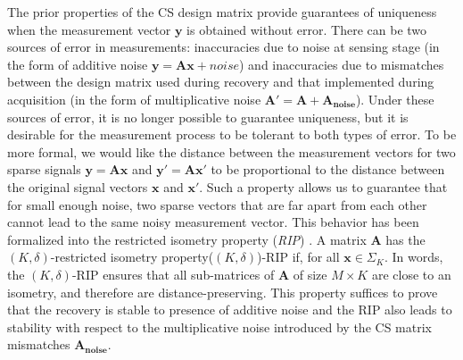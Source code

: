 \documentclass[journal]{IEEEtran}
\begin{document}
The prior properties of the CS design matrix provide guarantees of uniqueness when the measurement vector $\boldsymbol{y}$ is obtained without error. There can be two sources of error in measurements: inaccuracies due to noise at sensing stage (in the form of additive noise $\boldsymbol{y}=\boldsymbol{A}\boldsymbol{x}+noise$) and inaccuracies due to mismatches between the design matrix used during recovery and that implemented during acquisition (in the form of multiplicative noise $\boldsymbol{A'}=\boldsymbol{A}+\boldsymbol{A_{noise}}$). Under these sources of error, it is no longer possible to guarantee uniqueness, but it is desirable for the measurement process to be tolerant to both types of error. To be more formal, we would like the distance between the measurement vectors for two sparse signals $\boldsymbol{y}=\boldsymbol{A}\boldsymbol{x}$ and $\boldsymbol{y'}=\boldsymbol{A}\boldsymbol{x'}$ to be proportional to the distance between the original signal vectors $\boldsymbol{x}$ and $\boldsymbol{x'}$. Such a property allows us to guarantee that for small enough noise, two sparse vectors that are far apart from each other cannot lead to the same noisy measurement vector. This behavior has been formalized into the restricted isometry property (\textit{RIP}) \cite{Moreira2014, Romberg2013, CANDES2008589, Blanchard2011}. A matrix $\boldsymbol{A}$ has the $(K,\delta)$-restricted isometry property($(K,\delta)$)-RIP if, for all $\boldsymbol{x}\in\Sigma_K$. In words, the $(K,\delta)$-RIP ensures that all sub-matrices of $\boldsymbol{A}$ of size $M\times K$ are close to an isometry, and therefore are distance-preserving. This property suffices to prove that the recovery is stable to presence of additive noise and the RIP also leads to stability with respect to the multiplicative noise introduced by the CS matrix mismatches $\boldsymbol{A_{noise}}$.








 



\end{document}

